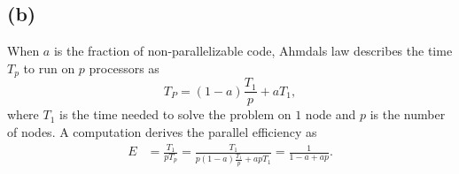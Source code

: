   
  \FloatBarrier
  
  
  
\subsection*{(b)}
\FloatBarrier
When $a$ is the fraction of non-parallelizable code, Ahmdals law describes the time $T_p$ to run on $p$ processors as
\[
T_P = (1 - a)\frac{T_1}{p} + a T_1,
\]
where $T_1$ is the time needed to solve the problem on $1$ node and $p$ is the number of nodes. A computation derives the parallel efficiency as
\begin{align*}
	E & = \frac{T_1}{pT_p} = \frac{T_1}{p(1 - a)\frac{T_1}{p} + ap T_1} = \frac{1}{1 - a + ap}.
\end{align*}
\FloatBarrier

